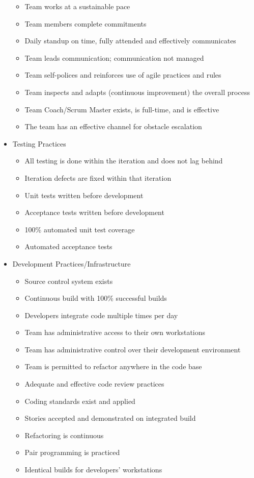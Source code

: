 \begin{appendices}
\begin{itemize}
\begin{itemize}
			\item Team works at a sustainable pace
			\item Team members complete commitments
			\item Daily standup on time, fully attended and effectively communicates
			\item Team leads communication; communication not managed
			\item Team self-polices and reinforces use of agile practices and rules
			\item Team inspects and adapts (continuous improvement) the overall process
			\item Team Coach/Scrum Master exists, is full-time, and is effective
			\item The team has an effective channel for obstacle escalation
		\end{itemize}
	\item Testing Practices
		\begin{itemize}
			\item All testing is done within the iteration and does not lag behind
			\item Iteration defects are fixed within that iteration
			\item Unit tests written before development
			\item Acceptance tests written before development
			\item 100\% automated unit test coverage
			\item Automated acceptance tests
		\end{itemize}
	\item Development Practices/Infrastructure
		\begin{itemize}
			\item Source control system exists
			\item Continuous build with 100\% successful builds
			\item Developers integrate code multiple times per day
			\item Team has administrative access to their own workstations
			\item Team has administrative control over their development environment
			\item Team is permitted to refactor anywhere in the code base
			\item Adequate and effective code review practices
			\item Coding standards exist and applied
			\item Stories accepted and demonstrated on integrated build
			\item Refactoring is continuous
			\item Pair programming is practiced
			\item Identical builds for developers' workstations
		\end{itemize}
\end{itemize}









\end{appendices}
